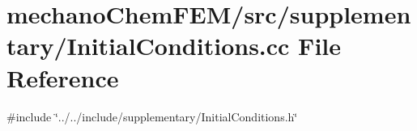 \section{mechano\+Chem\+F\+E\+M/src/supplementary/\+Initial\+Conditions.cc File Reference}
\label{_initial_conditions_8cc}
{\ttfamily \#include \char`\"{}../../include/supplementary/\+Initial\+Conditions.\+h\char`\"{}}\newline
